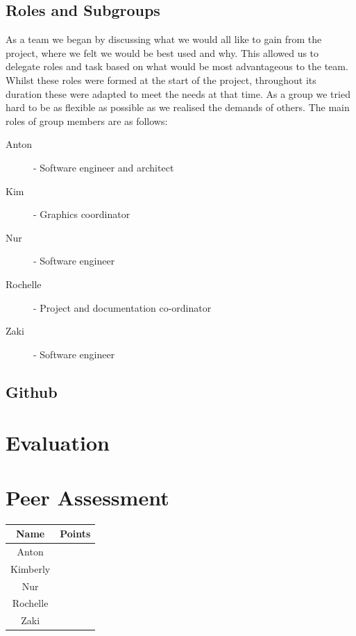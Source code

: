 \documentclass{article}
\begin{document}
 
	\subsection{Roles and Subgroups}
	
	As a team we began by discussing what we would all like to gain from the project, where we felt we would be best used and why. 
	This allowed us to delegate roles and task based on what would be most advantageous to the team. 
	Whilst these roles were formed at the start of the project, throughout its duration these were adapted to meet the needs at that time. 
	As a group we tried hard to be as flexible as possible as we realised the demands of others.
	The main roles of group members are as follows:
	
	\begin{description}
		\item [Anton] - Software engineer and architect
		\item [Kim] - Graphics coordinator
		\item [Nur] - Software engineer
		\item [Rochelle] - Project and documentation co-ordinator
		\item [Zaki] - Software engineer
	\end{description}
	
	
	\subsection{Github}
\section{Evaluation}
	
	
\section{Peer Assessment}
\begin{tabular}{|c|c|}
	\hline Name & Points \\ 
	\hline Anton &  \\ 
	\hline Kimberly &  \\ 
	\hline Nur &  \\ 
	\hline Rochelle &  \\ 
	\hline  Zaki &  \\ 
	\hline 
\end{tabular} 
	


\end{document}
